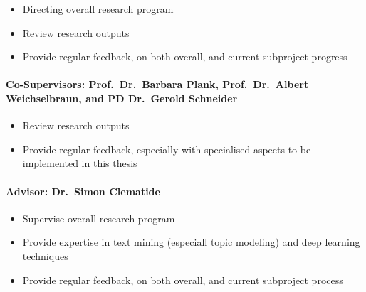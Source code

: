 \begin{itemize}
	\item Directing overall research program
	\item Review research outputs
	\item Provide regular feedback, on both overall, and current subproject progress
\end{itemize}

\paragraph{Co-Supervisors: Prof.~Dr.~Barbara Plank, Prof.~Dr.~Albert Weichselbraun, and PD Dr.~Gerold Schneider}

\begin{itemize}
    \item Review research outputs
    \item Provide regular feedback, especially with specialised aspects to be implemented in this thesis
\end{itemize}

\paragraph{Advisor: Dr.~Simon Clematide}

\begin{itemize}
	\item Supervise overall research program
	\item Provide expertise in text mining (especiall topic modeling) and deep learning techniques
	\item Provide regular feedback, on both overall, and current subproject process
\end{itemize}